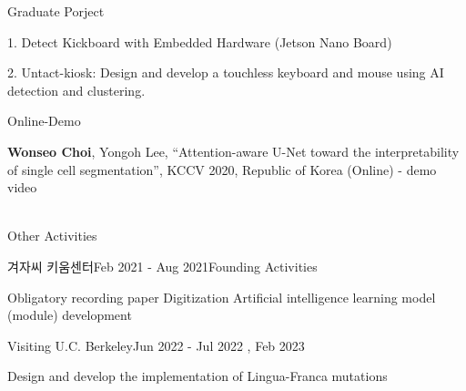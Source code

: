 \documentclass[
	11pt, %
]{resume} %
\begin{document}
\begin{rSection}{Graduate Porject}
	
	1. Detect Kickboard with Embedded Hardware (Jetson Nano Board) 

	2. Untact-kiosk: Design and develop a touchless keyboard and mouse using AI detection and clustering.

\end{rSection}

\begin{rSection}{Online-Demo}
	
	\textbf{Wonseo Choi}, Yongoh Lee, “Attention-aware U-Net toward the interpretability of single cell segmentation”, KCCV 2020, Republic of Korea (Online) - demo video
	\\
	\\
\end{rSection}

	



\begin{rSection}{Other Activities}

	\begin{rSubsection}{겨자씨 키움센터}{Feb 2021 - Aug 2021}{Founding Activities}{}
		\item Obligatory recording paper Digitization Artiﬁcial intelligence learning model (module) development
	\end{rSubsection}

	\begin{rSubsection}{Visiting U.C. Berkeley}{Jun 2022 - Jul 2022 , Feb 2023}{}{}
		\item Design and develop the implementation of Lingua-Franca mutations
	\end{rSubsection}

\end{rSection}
\end{document}
